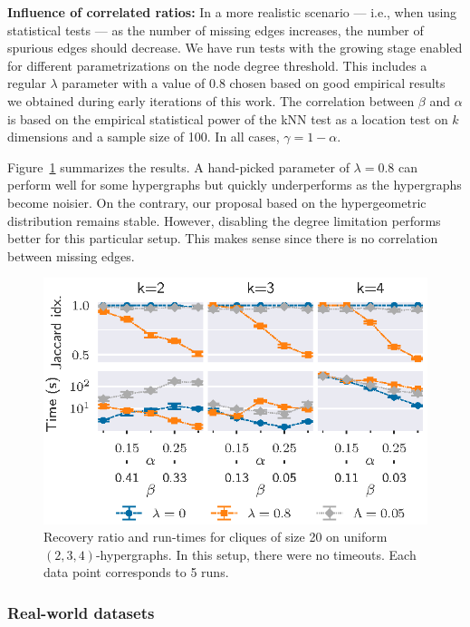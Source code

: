 \textbf{Influence of correlated ratios:}
In a more realistic scenario --- i.e., when using statistical tests --- as the number of missing edges
increases, the number of spurious edges should decrease.
We have run tests with the growing stage enabled for different parametrizations on the node degree
threshold. This includes a regular $\lambda$ parameter with a value of $0.8$ chosen based on
good empirical results we obtained during early iterations of this work.
The correlation between $\beta$ and $\alpha$ is based on the empirical statistical power of the
\gls{kNN} test as a location test on $k$ dimensions and a sample size of 100.
In all cases, $\gamma = 1 - \alpha$.

Figure~\ref{fig:hyper_ab_corr} summarizes the results. A hand-picked parameter of $\lambda = 0.8$ can
perform well for some hypergraphs but quickly underperforms as the hypergraphs become noisier.
On the contrary, our proposal based on the hypergeometric distribution remains stable.
However, disabling the degree limitation performs better for this particular setup.
This makes sense since there is no correlation between missing edges.

\begin{figure}[ht]
    \centering
    \includegraphics{images/5_presq/quasi_corr_20}
    \caption[Recovery ratio and run-times for cliques of size 20 on uniform $(2,3,4)$-hypergraphs.]{
    Recovery ratio and run-times for cliques of size 20 on uniform $(2,3,4)$-hypergraphs.
    In this setup, there were no timeouts. Each data point corresponds to 5 runs.
    }
    \label{fig:hyper_ab_corr}
\end{figure}

\subsubsection{Real-world datasets}
\label{sec:results_real}

